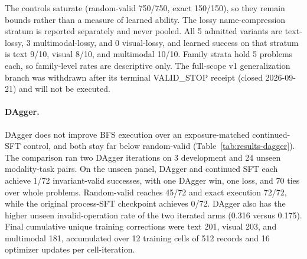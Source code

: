 The controls saturate (random-valid 750/750, exact 150/150), so they remain bounds rather than a measure of learned ability. The lossy name-compression stratum is reported separately and never pooled. All 5 admitted variants are text-lossy, 3 multimodal-lossy, and 0 visual-lossy, and learned success on that stratum is text 9/10, visual 8/10, and multimodal 10/10. Family strata hold 5 problems each, so family-level rates are descriptive only. The full-scope v1 generalization branch was withdrawn after its terminal VALID\_STOP receipt (closed 2026-09-21) and will not be executed.

\paragraph{DAgger.} DAgger \citep{ross2011dagger} does not improve BFS execution over an exposure-matched continued-SFT control, and both stay far below random-valid (Table~\ref{tab:results-dagger}). The comparison ran two DAgger iterations on 3 development and 24 unseen modality-task pairs. On the unseen panel, DAgger and continued SFT each achieve 1/72 invariant-valid successes, with one DAgger win, one loss, and 70 ties over whole problems. Random-valid reaches 45/72 and exact execution 72/72, while the original process-SFT checkpoint achieves 0/72. DAgger also has the higher unseen invalid-operation rate of the two iterated arms (0.316 versus 0.175). Final cumulative unique training corrections were text 201, visual 203, and multimodal 181, accumulated over 12 training cells of 512 records and 16 optimizer updates per cell-iteration.

